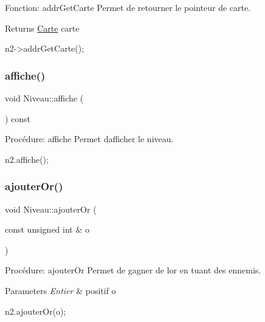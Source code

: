 Fonction\+: addr\+Get\+Carte Permet de retourner le pointeur de carte. 

\begin{DoxyReturn}{Returns}
\hyperlink{classCarte}{Carte} carte 
\begin{DoxyCode}
n2->addrGetCarte();
\end{DoxyCode}
 
\end{DoxyReturn}
\mbox{\label{classNiveau_ac0aff25fcdea980ff740344f58be0bbc}} 
\subsubsection{\texorpdfstring{affiche()}{affiche()}}
{\footnotesize\ttfamily void Niveau\+::affiche (\begin{DoxyParamCaption}{ }\end{DoxyParamCaption}) const}



Procédure\+: affiche Permet d\textquotesingle{}afficher le niveau. 


\begin{DoxyCode}
n2.affiche();
\end{DoxyCode}
 \mbox{\label{classNiveau_adf4df9af322f4354ca4a9adeffd5eb29}} 
\subsubsection{\texorpdfstring{ajouter\+Or()}{ajouterOr()}}
{\footnotesize\ttfamily void Niveau\+::ajouter\+Or (\begin{DoxyParamCaption}\item[{const unsigned int \&}]{o }\end{DoxyParamCaption})}



Procédure\+: ajouter\+Or Permet de gagner de l\textquotesingle{}or en tuant des ennemis. 


\begin{DoxyParams}{Parameters}
{\em Entier} & positif o 
\begin{DoxyCode}
n2.ajouterOr(o);
\end{DoxyCode}
 \\
\hline
\end{DoxyParams}
\mbox{\label{classNiveau_aa94199eb0d75ab0d17c05272667e07a3}} 

